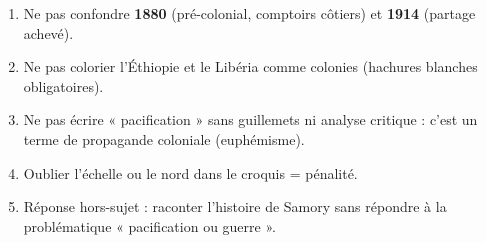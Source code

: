\documentclass[11pt]{article}
\newcommand{\cle}[1]{{\popxbold\color{popdark}#1}}
\begin{document}
\begin{attention}
\begin{enumerate}
    \item Ne pas confondre \textbf{1880} (pré-colonial, comptoirs côtiers) et \textbf{1914} (partage achevé).
    \item Ne pas colorier l'Éthiopie et le Libéria comme colonies (hachures blanches obligatoires).
    \item Ne pas écrire « pacification » sans guillemets ni analyse critique : c'est un terme de propagande coloniale (\cle{euphémisme}).
    \item Oublier l'échelle ou le nord dans le croquis = pénalité.
    \item Réponse hors-sujet : raconter l'histoire de Samory sans répondre à la problématique « pacification ou guerre ».
\end{enumerate}
\end{attention}
\end{document}

